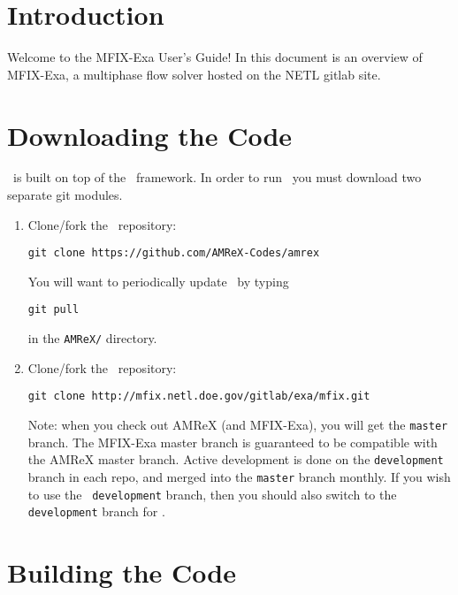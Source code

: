 
\section{Introduction}

Welcome to the MFIX-Exa User's Guide!  In this document is an overview 
of MFIX-Exa, a multiphase flow solver hosted on the NETL gitlab site. 

\section{Downloading the Code}

\mfix\ is built on top of the \amrex\ framework.  In order to run
\mfix\, you must download two separate git modules.

\vspace{.1in}

\vspace{.1in}

\begin{enumerate}

\item Clone/fork the \amrex\ repository:
\begin{verbatim}
git clone https://github.com/AMReX-Codes/amrex
\end{verbatim}

You will want to periodically update \amrex\ by typing
\begin{verbatim}
git pull
\end{verbatim}
in the {\tt AMReX/} directory.

\item Clone/fork the \mfix\ repository:
\begin{verbatim}
git clone http://mfix.netl.doe.gov/gitlab/exa/mfix.git
\end{verbatim}

Note: when you check out AMReX (and MFIX-Exa), you will get the {\tt master}
branch.   The MFIX-Exa master branch is guaranteed to be compatible
with the AMReX master branch.
Active development is done on the {\tt development} branch
in each repo, and merged into the {\tt master} branch monthly.
If you wish to use the \amrex\ {\tt development} branch, then you
should also switch to the {\tt development} branch for \amrex.

\end{enumerate}

\section{Building the Code}


